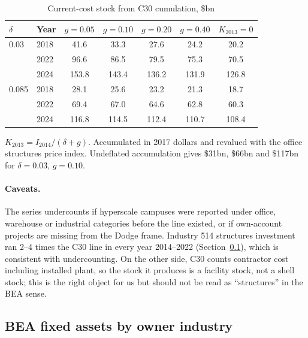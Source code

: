 \documentclass[11pt]{article}
\newcommand{\bn}{\$bn}
\begin{document}
\begin{table}[ht]
\centering
\begin{threeparttable}
\caption{Current-cost stock from C30 cumulation, \bn}
\label{tab:pim}
\begin{tabular}{llccccc}
\toprule
$\delta$ & Year & $g=0.05$ & $g=0.10$ & $g=0.20$ & $g=0.40$ & $K_{2013}=0$ \\
\midrule
0.03  & 2018 & 41.6 & 33.3 & 27.6 & 24.2 & 20.2 \\
      & 2022 & 96.6 & 86.5 & 79.5 & 75.3 & 70.5 \\
      & 2024 & 153.8 & 143.4 & 136.2 & 131.9 & 126.8 \\
0.085 & 2018 & 28.1 & 25.6 & 23.2 & 21.3 & 18.7 \\
      & 2022 & 69.4 & 67.0 & 64.6 & 62.8 & 60.3 \\
      & 2024 & 116.8 & 114.5 & 112.4 & 110.7 & 108.4 \\
\bottomrule
\end{tabular}
\begin{tablenotes}\footnotesize
\item $K_{2013}=I_{2014}/(\delta+g)$. Accumulated in 2017 dollars and revalued with the office structures price index. Undeflated accumulation gives \$31bn, \$66bn and \$117bn for $\delta=0.03$, $g=0.10$.
\end{tablenotes}
\end{threeparttable}
\end{table}

\paragraph{Caveats.} The series undercounts if hyperscale campuses were reported under office, warehouse or industrial categories before the line existed, or if own-account projects are missing from the Dodge frame. Industry 514 structures investment ran 2--4 times the C30 line in every year 2014--2022 (Section~\ref{sec:fa}), which is consistent with undercounting. On the other side, C30 counts contractor cost including installed plant, so the stock it produces is a facility stock, not a shell stock; this is the right object for us but should not be read as ``structures'' in the BEA sense.

\subsection{BEA fixed assets by owner industry}
\label{sec:fa}
\end{document}
